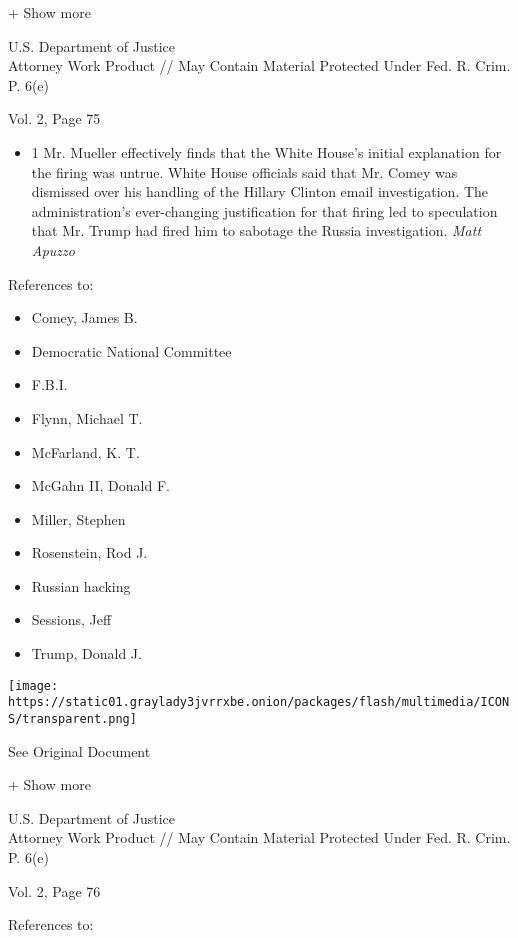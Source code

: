 + Show more

U.S. Department of Justice\\
Attorney Work Product // May Contain Material Protected Under Fed. R.
Crim. P. 6(e)

Vol. 2, Page 75

\begin{itemize}
\tightlist
\item
  1 Mr. Mueller effectively finds that the White House's initial
  explanation for the firing was untrue. White House officials said that
  Mr. Comey was dismissed over his handling of the Hillary Clinton email
  investigation. The administration's ever-changing justification for
  that firing led to speculation that Mr. Trump had fired him to
  sabotage the Russia investigation. \emph{Matt Apuzzo}
\end{itemize}

References to:

\begin{itemize}
\tightlist
\item
  Comey, James B.
\item
  Democratic National Committee
\item
  F.B.I.
\item
  Flynn, Michael T.
\item
  McFarland, K. T.
\item
  McGahn II, Donald F.
\item
  Miller, Stephen
\item
  Rosenstein, Rod J.
\item
  Russian hacking
\item
  Sessions, Jeff
\item
  Trump, Donald J.
\end{itemize}

\protect\hyperlink{}{}

\texttt{[image: https://static01.graylady3jvrrxbe.onion/packages/flash/multimedia/ICONS/transparent.png]}

See Original Document

+ Show more

U.S. Department of Justice\\
Attorney Work Product // May Contain Material Protected Under Fed. R.
Crim. P. 6(e)

Vol. 2, Page 76

References to:

